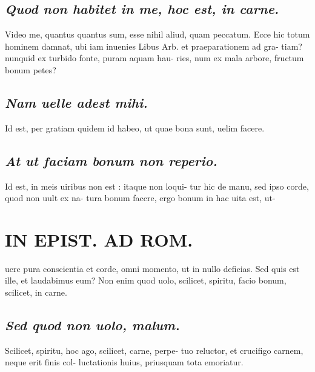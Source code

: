 \documentclass{article}
\begin{document}
\begin{pages}
\subsection*{\textit{Quod non habitet in me, hoc est, in carne. }}\pstart Video me, quantus quantus sum, esse nihil aliud, quam peccatum. Ecce hic totum hominem damnat, ubi iam inuenies Libus Arb. et praeparationem ad gra- tiam? nunquid ex turbido fonte, puram aquam hau- ries, num ex mala arbore, fructum bonum petes?  \pend
{}
{}
\subsection*{\textit{Nam uelle adest mihi. }}\pstart Id est, per gratiam quidem id habeo, ut quae bona sunt, uelim facere.   \pend
{}
{}
\subsection*{\textit{At ut faciam bonum non reperio. }}\pstart Id est, in meis uiribus non est : itaque non loqui- tur hic de manu, sed ipso corde, quod non uult ex na- tura bonum faccre, ergo bonum in hac uita est, ut-  \pend
\section*{IN EPIST. AD ROM.   }
\marginpar{[ p.]}\pstart uerc pura conscientia et corde, omni momento, ut in nullo deficias. Sed quis est ille, et laudabimus eum? Non enim quod uolo, scilicet, spiritu, facio bonum, scilicet, in carne.   \pend
{}
{}
\subsection*{\textit{Sed quod non uolo, malum. }}\pstart Scilicet, spiritu, hoc ago, scilicet, carne, perpe- tuo reluctor, et crucifigo carnem, neque erit finis col- luctationis huius, priusquam tota emoriatur.   \pend
{}
{}

\end{pages}
\end{document}
